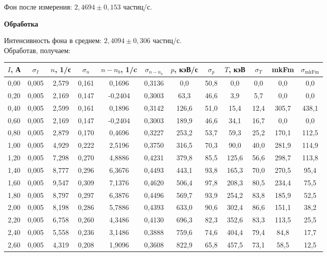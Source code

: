 \documentclass[12pt]{article}
\begin{document}
Фон после измерения: $2,4694 \pm 0,153$ частиц/с.
\begin{center}
    \textbf{Обработка}
\end{center}
Интенсивность фона в среднем: $2,4094 \pm 0,306$ частиц/с.
\\
Обработав, получаем:
\begin{center}
    \begin{tabular}{|c|c|c|c|c|c|c|c|c|c|c|c|}
      \hline
      $I$, А & $\sigma_I$ & $n$, 1/с & $\sigma_{n}$ & $n-n_{b}$, 1/c & $\sigma_{n-n_{b}}$ & $p$, кэВ/с & $\sigma_{p}$ & $T$, кэВ & $\sigma_{T}$ & mkFm & $\sigma_{\text{mkFm}}$ \\ \hline
      0,00 & 0,005 & 2,579 & 0,161 & 0,1696 & 0,3136 & 0,0 & 50,8 & 0,0 & 0,0 & 0,0 & 0,0 \\ \hline
0,20 & 0,005 & 2,169 & 0,147 & -0,2404 & 0,3003 & 63,3 & 46,6 & 3,9 & 5,7 & 0,0 & 0,0 \\ \hline
0,40 & 0,005 & 2,599 & 0,161 & 0,1896 & 0,3142 & 126,6 & 51,0 & 15,4 & 12,4 & 305,7 & 438,1 \\ \hline
0,60 & 0,005 & 2,169 & 0,147 & -0,2404 & 0,3003 & 189,9 & 46,6 & 34,1 & 16,7 & 0,0 & 0,0 \\ \hline
0,80 & 0,005 & 2,879 & 0,170 & 0,4696 & 0,3227 & 253,2 & 53,7 & 59,3 & 25,2 & 170,1 & 112,5 \\ \hline
1,00 & 0,005 & 4,929 & 0,222 & 2,5196 & 0,3750 & 316,5 & 70,3 & 90,0 & 40,0 & 281,9 & 114,9 \\ \hline
1,20 & 0,005 & 7,298 & 0,270 & 4,8886 & 0,4231 & 379,8 & 85,5 & 125,6 & 56,6 & 298,7 & 113,8 \\ \hline
1,40 & 0,005 & 8,777 & 0,296 & 6,3676 & 0,4493 & 443,1 & 93,8 & 165,3 & 70,0 & 270,5 & 95,4 \\ \hline
1,60 & 0,005 & 9,547 & 0,309 & 7,1376 & 0,4620 & 506,4 & 97,8 & 208,3 & 80,5 & 234,4 & 75,5 \\ \hline
1,80 & 0,005 & 8,797 & 0,297 & 6,3876 & 0,4496 & 569,7 & 93,9 & 254,2 & 83,8 & 185,9 & 52,5 \\ \hline
2,00 & 0,005 & 8,198 & 0,286 & 5,7886 & 0,4393 & 633,0 & 90,6 & 302,4 & 86,6 & 151,1 & 38,2 \\ \hline
2,20 & 0,005 & 6,758 & 0,260 & 4,3486 & 0,4130 & 696,3 & 82,3 & 352,6 & 83,3 & 113,5 & 25,5 \\ \hline
2,40 & 0,005 & 5,558 & 0,236 & 3,1486 & 0,3888 & 759,6 & 74,6 & 404,4 & 79,4 & 84,8 & 17,7 \\ \hline
2,60 & 0,005 & 4,319 & 0,208 & 1,9096 & 0,3608 & 822,9 & 65,8 & 457,5 & 73,1 & 58,5 & 12,5 \\ \hline

\end{tabular}
\end{center}
\end{document}
